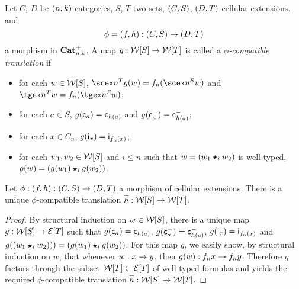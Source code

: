  \begin{paragr}\label{paragr:transl}
  Let $C$, $D$ be $(n,k)$-categories, $S$, $T$ two sets,  $(C,S)$, $(D,T)$ cellular extensions. and
  \[\phi=(f,h): (C,S)\to(D,T) \]
  a morphism in $\mathbf{Cat}_{n,k}^{+}$. A map $g:\mathcal{W}[S]\to\mathcal{W}[T]$ is called a {\em
   $\phi$-compatible translation} if
  \begin{itemize}
  \item for each $w\in\mathcal{W}[S]$, $\scex n^Tg(w)=f_n(\scex n^S w)$ and
    $\tgex n^T w=f_n(\tgex n^S w)$;
    \item for each $a\in S$, $g(\mathsf{c}_{a})=\mathsf{c}_{h(a)}$ and $g(\mathsf{c}^{-}_{a})=\mathsf{c}^{-}_{h(a)}$;
    \item for each $x\in C_n$,  $g(\mathsf{i}_{x})=\mathsf{i}_{f_n(x)}$;
    \item  for each $w_1,w_2\in\mathcal{W}[S]$ and $i\leq n$ such that
      $w=(w_1\bm{\star}_{i} w_2)$ is well-typed, $g(w)=(g(w_1)\bm{\star}_{i} g(w_2))$.  
    \end{itemize}
\end{paragr}
\begin{lemma}\label{lemma:transl}
  Let $\phi:(f,h):(C,S)\to (D,T)$ a morphism of cellular
  extensions. There is a unique $\phi$-compatible translation $\overline{h}:\mathcal{W}[S]\to \mathcal{W}[T]$.
\end{lemma}
\begin{proof}
  By structural induction on $w\in\mathcal{W}[S]$, there is a unique map
  $g:\mathcal{W}[S]\to \mathcal{E}[T]$  such that $g(\mathsf{c}_{a})=\mathsf{c}_{h(a)}$, $g(\mathsf{c}^{-}_{a})=\mathsf{c}^{-}_{h(a)}$, $g(\mathsf{i}_{x})=\mathsf{i}_{f_n(x)}$ and $g((w_1\bm{\star}_{i}
      w_2)))=(g(w_1)\bm{\star}_{i} g(w_2))$. For this map $g$, we easily
      show, by structural induction on $w$, that
      whenever $w:x\to y$, then $g(w):f_nx\to f_n y$. Therefore
      $g$ factors through the subset $\mathcal{W}[T]\subset \mathcal{E}[T]$ of
      well-typed formulas and yields the required $\phi$-compatible
      translation $\overline{h}:\mathcal{W}[S]\to \mathcal{W}[T]$.
    \end{proof}

